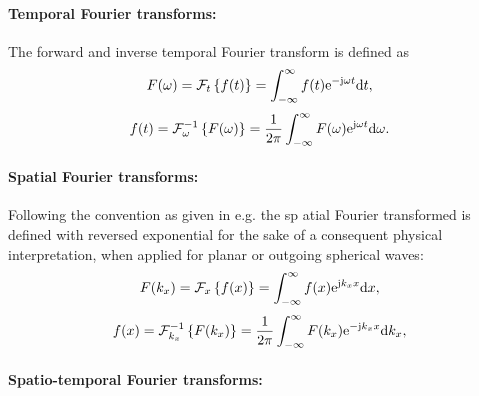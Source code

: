 \printnomenclature
%
\paragraph{Temporal Fourier transforms:}
The forward and inverse temporal Fourier transform is defined as 
\begin{equation}
\label{eq:temporal_fourier_transform_def}
F(\omega) = \mathcal{F}_t \left\{ f(t) \right\} = \int_ {-\infty}^{\infty} f(t) \mathrm{e}^{-\mathrm{j} \omega t} \mathrm{d} t,
\end{equation}
\begin{equation}
\label{eq:temporal_inverse_fourier_transform_def}
f(t) = \mathcal{F}_{\omega}^{-1} \left\{ F(\omega) \right\} = \frac{1}{2\pi} \int_ {-\infty}^{\infty} F(\omega) \mathrm{e}^{ \mathrm{j} \omega t} \mathrm{d} \omega.
\end{equation}
%
\paragraph{Spatial Fourier transforms:}
Following the convention as given in e.g. \cite{Williams1999} the sp	atial Fourier transformed is defined with reversed exponential for the sake of a consequent physical interpretation, when applied for planar or outgoing spherical waves:
\begin{equation}
\label{eq:spatial_fourier_transform_def}
F(k_x) = \mathcal{F}_x \left\{ f(x) \right\} = \int_ {-\infty}^{\infty} f(x) \mathrm{e}^{\mathrm{j} k_x x} \mathrm{d} x,
\end{equation}
\begin{equation}
\label{eq:spatial_inverse_fourier_transform_def}
f(x) = \mathcal{F}_{k_x}^{-1} \left\{ F(k_x) \right\} = \frac{1}{2\pi} \int_ {-\infty}^{\infty} F(k_x) \mathrm{e}^{ -\mathrm{j} k_x x} \mathrm{d} k_x,
\end{equation}


%
\paragraph{Spatio-temporal Fourier transforms:}